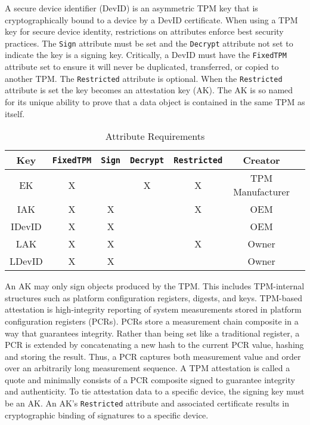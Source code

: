 \documentclass[runningheads]{llncs}
\begin{document}

A secure device identifier (DevID) is an asymmetric TPM key that is
cryptographically bound to a device by a DevID certificate. When using
a TPM key for secure device identity, restrictions on attributes
enforce best security practices.  The \verb|Sign| attribute must be
set and the \verb|Decrypt| attribute not set to indicate the key is a
signing key.  Critically, a DevID must have the \verb|FixedTPM|
attribute set to ensure it will never be duplicated, transferred, or
copied to another TPM.  The \verb|Restricted| attribute is
optional. When the \verb|Restricted| attribute is set the key becomes
an attestation key (AK).  The AK is so named for its unique ability to
prove that a data object is contained in the same TPM as itself.

\begin{table}[h]
  \begin{center}
    \footnotesize
    \begin{tabular}{ |c|c|c|c|c|c|c| }
      \hline
      Key & \verb|FixedTPM| & \verb|Sign| & \verb|Decrypt| & \verb|Restricted| & Creator \\
      \hline
      \hline
      EK & X &   & X & X & TPM Manufacturer \\
      \hline
      IAK & X & X &   & X & OEM \\
      \hline
      IDevID & X & X &   &   & OEM \\
      \hline
      LAK & X & X &   & X & Owner \\
      \hline
      LDevID & X & X &   &   & Owner \\
      \hline
    \end{tabular}
    \caption{Attribute Requirements}
    \label{fig:req_and_recs}
  \end{center}
\end{table}

An AK may only sign objects produced by the TPM. This includes
TPM-internal structures such as platform configuration registers,
digests, and keys.  TPM-based attestation is high-integrity reporting
of system measurements stored in platform configuration registers
(PCRs).  PCRs store a measurement chain composite in a way that
guarantees integrity. Rather than being set like a traditional
register, a PCR is extended by concatenating a new hash to the current
PCR value, hashing and storing the result.  Thus, a PCR captures both
measurement value and order over an arbitrarily long measurement
sequence.  A TPM attestation is called a quote and minimally consists
of a PCR composite signed to guarantee integrity and authenticity. To
tie attestation data to a specific device, the signing key must be an
AK. An AK's \verb|Restricted| attribute and associated certificate results in cryptographic binding of signatures to a specific device.
\end{document}
